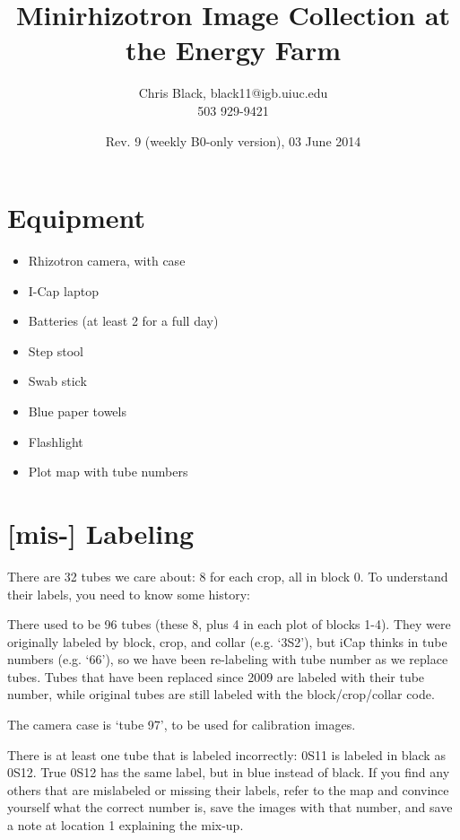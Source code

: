 \documentclass[11pt]{article}
\title{Minirhizotron Image Collection at the Energy Farm}
\author{Chris Black, black11@igb.uiuc.edu\\503 929-9421}
\date{Rev. 9 (weekly B0-only version), 03 June 2014}
\begin{document}
\maketitle


\section{Equipment}
	\begin{itemize}
		\item{Rhizotron camera, with case}
		\item{I-Cap laptop}
		\item{Batteries (at least 2 for a full day)}	
		\item{Step stool}
		\item{Swab stick}
		\item{Blue paper towels}
		\item{Flashlight}
		\item{Plot map with tube numbers}
	\end{itemize}

	
\section{[mis-] Labeling} 
	There are 32 tubes we care about: 8 for each crop, all in block 0. To understand their labels, you need to know some history:

	There used to be 96 tubes (these 8, plus 4 in each plot of blocks 1-4). They were originally labeled by block, crop, and collar (e.g. `3S2'), but iCap thinks in tube numbers (e.g. `66'), so we have been re-labeling with tube number as we replace tubes. Tubes that have been replaced since 2009 are labeled with their tube number, while original tubes are still labeled with the block/crop/collar code. 

	The camera case is `tube 97', to be used for calibration images. 
	
	There is at least one tube that is labeled incorrectly: 0S11 is labeled in black as 0S12. True 0S12 has the same label, but in blue instead of black. If you find any others that are mislabeled or missing their labels, refer to the map and convince yourself what the correct number is, save the images with that number, and save a note at location 1 explaining the mix-up.
\end{document}
